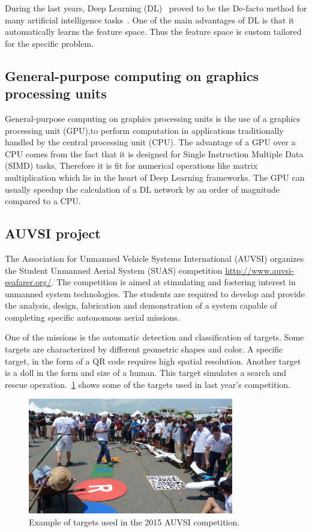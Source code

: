 \documentclass{article} %
\begin{document}
During the last years, Deep Learning (DL)~\cite{Bengio2009, LeCun2015} proved to
be the De-facto method for many artificial intelligence
tasks~\cite{hadsell2009learning, eigen2014depth, ross2013learning}. One of the
main advantages of DL is that it automatically learns the feature space. Thus
the feature space is custom tailored for the specific problem.

\subsection{General-purpose computing on graphics processing units}

General-purpose computing on graphics processing units is the use of a graphics
processing unit (GPU),to perform computation in applications traditionally
handled by the central processing unit (CPU). The advantage of a GPU over a CPU
comes from the fact that it is designed for Single Instruction Multiple Data
(SIMD) tasks. Therefore it is fit for numerical operations like matrix
multiplication which lie in the heart of Deep Learning frameworks. The GPU can
usually speedup the calculation of a DL network by an order of magnitude
compared to a CPU.

\subsection{AUVSI project}

The Association for Unmanned Vehicle Systems International (AUVSI) organizes the
Student Unmanned Aerial System (SUAS) competition
\url{http://www.auvsi-seafarer.org/}. The competition is aimed  at stimulating
and fostering interest in unmanned system technologies. The  students  are
required  to  develop  and  provide  the  analysis, design, fabrication and
demonstration of a system capable of completing specific autonomous aerial
missions.

One of the missions is the automatic detection and classification of targets.
Some targets are characterized by different geometric shapes and color. A specific
target, in the form of a QR code requires high spatial resolution. Another
target is a doll in the form and size of a human. This target simulates a search
and rescue operation.~\cref{fig:targets} shows some of the targets used in last
year's competition.
\begin{figure}[h]
	\centering
	\includegraphics[width=0.8\textwidth]{auvsi_targets}
	\caption{Example of targets used in the 2015 AUVSI competition.}
	\label{fig:targets}
\end{figure}
\end{document}
